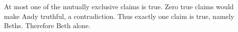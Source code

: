 At most one of the mutually exclusive claims is true. Zero true claims would make Andy truthful, a contradiction. Thus exactly one claim is true, namely Beth\textquotesingle s. Therefore $\boxed{\text{Beth alone}}$.
